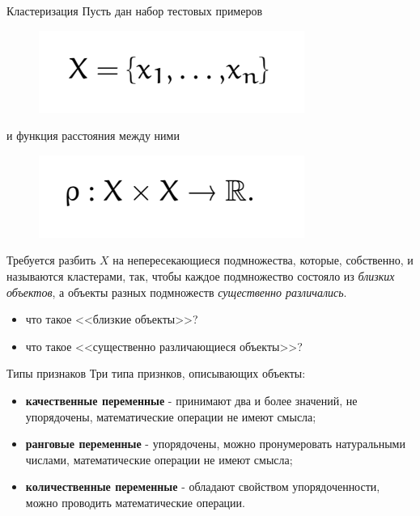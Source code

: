\documentclass{beamer}
\begin{document}
\begin{frame}{Кластеризация}
	Пусть дан набор тестовых примеров
	\begin{figure}[h]
		\centering
		\includegraphics[scale=0.4]{images/lec07-pic02.png}
	\end{figure}
	и функция расстояния между ними
	\begin{figure}[h]
		\centering
		\includegraphics[scale=0.4]{images/lec07-pic03.png}
	\end{figure}
	Требуется разбить $X$ на непересекающиеся подмножества, которые, собственно, и называются кластерами, так, чтобы каждое подмножество состояло из \textit{близких объектов}, а объекты разных подмножеств \textit{существенно различались}.
	\begin{itemize}
		\item что такое <<близкие объекты>>?
		\item что такое <<существенно различающиеся объекты>>?
\end{itemize}
\end{frame}

\begin{frame}{Типы признаков}
	Три типа признков, описывающих объекты:
	\begin{itemize}
	    \item \textbf{качественные переменные} - принимают два и более значений, не упорядочены, математические операции не имеют смысла;
	    \item \textbf{ранговые переменные} - упорядочены, можно пронумеровать натуральными числами, математические операции не имеют смысла;
	    \item \textbf{количественные переменные} - обладают свойством упорядоченности, можно проводить математические операции.	    
	\end{itemize}
\end{frame}
\end{document}
